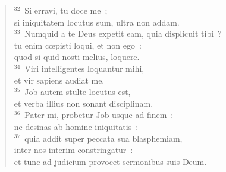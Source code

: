 \begin{flushleft}
\begin{verse}
${}^{32}$~Si erravi, tu doce me~;\\ si iniquitatem locutus sum, ultra non addam.\\
${}^{33}$~Numquid a te Deus expetit eam, quia displicuit tibi~?\\ tu enim cœpisti loqui, et non ego~:\\ quod si quid nosti melius, loquere.\\
${}^{34}$~Viri intelligentes loquantur mihi,\\ et vir sapiens audiat me.\\
${}^{35}$~Job autem stulte locutus est,\\ et verba illius non sonant disciplinam.\\
${}^{36}$~Pater mi, probetur Job usque ad finem~:\\ ne desinas ab homine iniquitatis~:\\
${}^{37}$~quia addit super peccata sua blasphemiam,\\ inter nos interim constringatur~:\\ et tunc ad judicium provocet sermonibus suis Deum.\end{verse}\end{flushleft}



